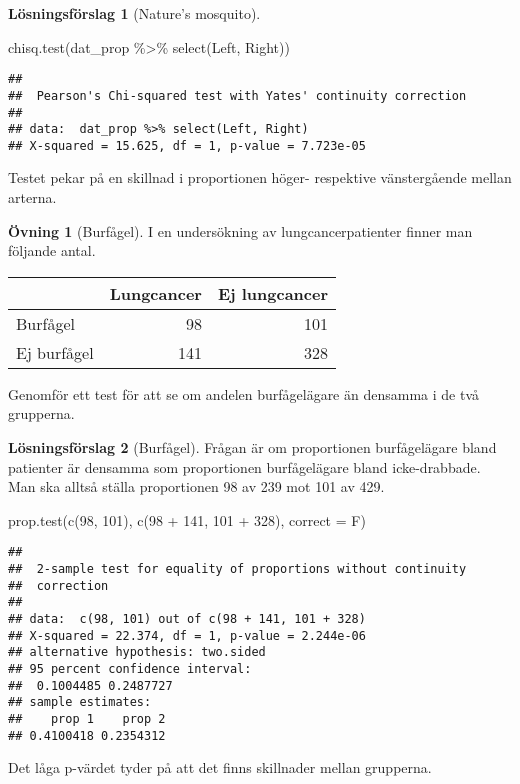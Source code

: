 \documentclass[
]{book}
\newenvironment{Shaded}{\begin{snugshade}}{\end{snugshade}}
\newcommand{\AttributeTok}[1]{\textcolor[rgb]{0.77,0.63,0.00}{#1}}
\newcommand{\DecValTok}[1]{\textcolor[rgb]{0.00,0.00,0.81}{#1}}
\newcommand{\FunctionTok}[1]{\textcolor[rgb]{0.00,0.00,0.00}{#1}}
\newcommand{\NormalTok}[1]{#1}
\newcommand{\SpecialCharTok}[1]{\textcolor[rgb]{0.00,0.00,0.00}{#1}}
\theoremstyle{definition}
\theoremstyle{definition}
\theoremstyle{definition}
\newtheorem{exercise}{Övning}[chapter]
\theoremstyle{definition}
\newtheorem{hypothesis}{Lösningsförslag}[chapter]
\theoremstyle{remark}
\begin{document}
\begin{hypothesis}[Nature's mosquito]
\begin{Shaded}
\begin{Highlighting}[]
\FunctionTok{chisq.test}\NormalTok{(dat\_prop }\SpecialCharTok{\%\textgreater{}\%} \FunctionTok{select}\NormalTok{(Left, Right))}
\end{Highlighting}
\end{Shaded}

\begin{verbatim}
## 
##  Pearson's Chi-squared test with Yates' continuity correction
## 
## data:  dat_prop %>% select(Left, Right)
## X-squared = 15.625, df = 1, p-value = 7.723e-05
\end{verbatim}

Testet pekar på en skillnad i proportionen höger- respektive vänstergående mellan arterna.
\end{hypothesis}

\begin{exercise}[Burfågel]
I en undersökning av lungcancerpatienter finner man följande antal.

\begin{table}
\centering
\begin{tabular}[t]{lrr}
\toprule
  & Lungcancer & Ej lungcancer\\
\midrule
Burfågel & 98 & 101\\
Ej burfågel & 141 & 328\\
\bottomrule
\end{tabular}
\end{table}

Genomför ett test för att se om andelen burfågelägare än densamma i de två grupperna.
\end{exercise}

\begin{hypothesis}[Burfågel]
Frågan är om proportionen burfågelägare bland patienter är densamma som proportionen burfågelägare bland icke-drabbade. Man ska alltså ställa proportionen 98 av 239 mot 101 av 429.

\begin{Shaded}
\begin{Highlighting}[]
\FunctionTok{prop.test}\NormalTok{(}\FunctionTok{c}\NormalTok{(}\DecValTok{98}\NormalTok{, }\DecValTok{101}\NormalTok{), }\FunctionTok{c}\NormalTok{(}\DecValTok{98} \SpecialCharTok{+} \DecValTok{141}\NormalTok{, }\DecValTok{101} \SpecialCharTok{+} \DecValTok{328}\NormalTok{), }\AttributeTok{correct =}\NormalTok{ F)}
\end{Highlighting}
\end{Shaded}

\begin{verbatim}
## 
##  2-sample test for equality of proportions without continuity
##  correction
## 
## data:  c(98, 101) out of c(98 + 141, 101 + 328)
## X-squared = 22.374, df = 1, p-value = 2.244e-06
## alternative hypothesis: two.sided
## 95 percent confidence interval:
##  0.1004485 0.2487727
## sample estimates:
##    prop 1    prop 2 
## 0.4100418 0.2354312
\end{verbatim}

Det låga p-värdet tyder på att det finns skillnader mellan grupperna.
\end{hypothesis}
\end{document}
